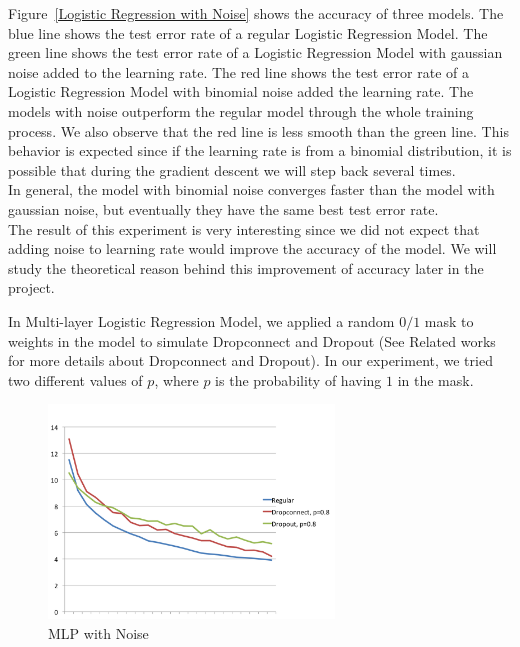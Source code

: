 Figure~\ref{Logistic Regression with Noise} shows the accuracy of
three models.
The blue line shows the test error rate of a regular Logistic Regression
Model. The green line shows the test error rate of a Logistic Regression
Model with gaussian noise added to the learning rate.
The red line shows the test error rate of a Logistic Regression Model
with binomial noise added the learning rate.
The models with noise outperform the regular model through the  whole
training process.
We also observe that the red line is less smooth than the green line.
This behavior is expected since if the learning rate is from a binomial
distribution, it is possible that during the gradient descent we will
step back several times. \\
In general, the model with binomial noise converges faster than the model
with gaussian noise, but eventually they have the same best test error
rate.\\
The result of this experiment is very interesting since we did not
expect that adding noise to learning rate would improve the accuracy
of the model. We will study the theoretical reason behind this improvement
of accuracy later in the project.

In Multi-layer Logistic Regression Model, we applied a random $0/1$ mask to
weights in the model to simulate Dropconnect and Dropout
(See Related works for more details about Dropconnect and Dropout).
In our experiment, we tried two different values of $p$, where $p$ is
the probability of having $1$ in the mask.
\begin{figure}
\centering
\caption{MLP with Noise}
\includegraphics[width=215pt]{figs/mlp_psmall.png}
\end{figure}




